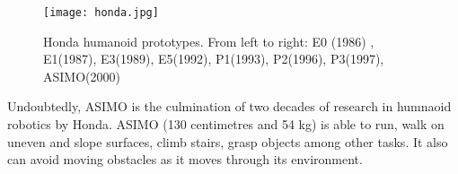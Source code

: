 \begin{figure}[!hbt]
\centering
\texttt{[image: honda.jpg]}
\caption{Honda humanoid prototypes. From left to right: E0 (1986) , E1(1987), E3(1989), E5(1992), P1(1993), P2(1996), P3(1997), ASIMO(2000)}
\label{fig:knight}
\end{figure}

Undoubtedly, ASIMO is the culmination of two decades of research in humnaoid robotics by Honda. ASIMO (130 centimetres and 54 kg) is able to run, walk on uneven and slope surfaces, climb stairs, grasp objects among other tasks. It also can avoid moving obstacles as it moves through its environment. 





